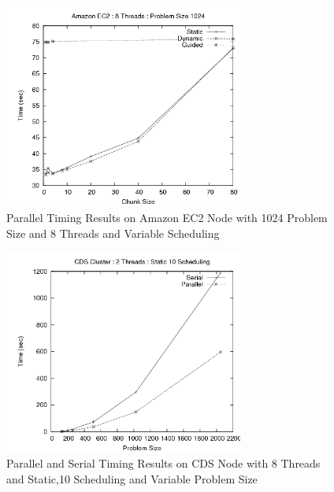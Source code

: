 \documentclass{article}
\begin{document}
\begin{figure}
\centering
\includegraphics[width=0.7\textwidth]{../data/amazon_chunk.png}
\caption{Parallel Timing Results on Amazon EC2 Node with 1024 Problem Size and 8 Threads and Variable Scheduling}
\label{amazon_chunk}
\end{figure}







\begin{figure}
\centering
\includegraphics[width=0.7\textwidth]{../data/cds_n.png}
\caption{Parallel and Serial Timing Results on CDS Node with 8 Threads and Static,10 Scheduling and Variable Problem Size}
\label{cds_n}
\end{figure}
\end{document}
